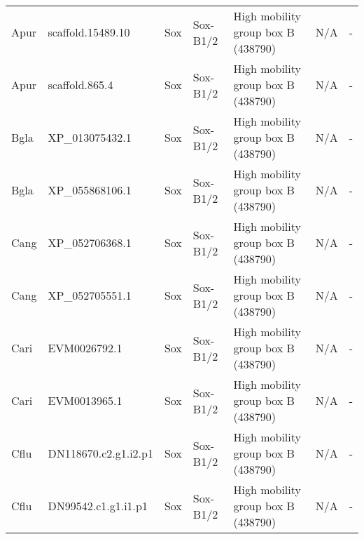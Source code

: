 \documentclass[../main.tex]{subfiles}
\begin{document}
\begin{landscape}
\begin{longtable}{lllllll}
		Apur           & scaffold.15489.10     & Sox            & Sox-B1/2            & High mobility group box B (438790)          & N/A                                                                    & -                    \\
		Apur           & scaffold.865.4        & Sox            & Sox-B1/2            & High mobility group box B (438790)          & N/A                                                                    & -                    \\
		Bgla           & XP\_013075432.1       & Sox            & Sox-B1/2            & High mobility group box B (438790)          & N/A                                                                    & -                    \\
		Bgla           & XP\_055868106.1       & Sox            & Sox-B1/2            & High mobility group box B (438790)          & N/A                                                                    & -                    \\
		Cang           & XP\_052706368.1       & Sox            & Sox-B1/2            & High mobility group box B (438790)          & N/A                                                                    & -                    \\
		Cang           & XP\_052705551.1       & Sox            & Sox-B1/2            & High mobility group box B (438790)          & N/A                                                                    & -                    \\
		Cari           & EVM0026792.1          & Sox            & Sox-B1/2            & High mobility group box B (438790)          & N/A                                                                    & -                    \\
		Cari           & EVM0013965.1          & Sox            & Sox-B1/2            & High mobility group box B (438790)          & N/A                                                                    & -                    \\
		Cflu           & DN118670.c2.g1.i2.p1  & Sox            & Sox-B1/2            & High mobility group box B (438790)          & N/A                                                                    & -                    \\
		Cflu           & DN99542.c1.g1.i1.p1   & Sox            & Sox-B1/2            & High mobility group box B (438790)          & N/A                                                                    & -                    \\

\end{longtable}
\end{landscape}
\end{document}
